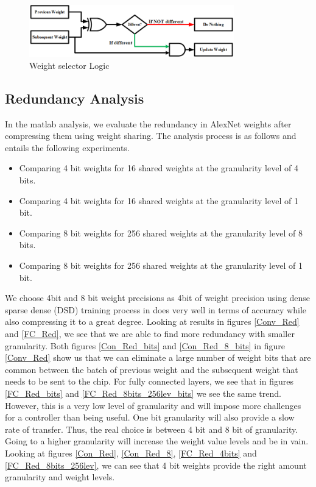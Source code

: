 \documentclass[conference]{IEEEtran}
\begin{document}
\begin{figure}[!ht]
\centering
\includegraphics[width=3.5in]{selector}
\caption{Weight selector Logic}
\label{sel}
\end{figure}

\subsection{Redundancy Analysis}
In the matlab analysis, we evaluate the redundancy in AlexNet weights after compressing them using weight sharing. 
The analysis process is as follows and entails the following experiments.
\begin{itemize}
\item Comparing 4 bit weights for 16 shared weights at the granularity level of 4 bits. 

\item Comparing 4 bit weights for 16 shared weights at the granularity level of 1 bit. 

\item Comparing 8 bit weights for 256 shared weights at the granularity level of 8 bits. 

\item Comparing 8 bit weights for 256 shared weights at the granularity level of 1 bit. 
\end{itemize}

We choose 4bit and 8 bit weight precisions as 4bit of weight precision using dense sparse dense (DSD) training process in \cite{han2016dsd} does very well in terms of accuracy while also compressing it to a great degree. Looking at results in figures \ref{Conv_Red} and \ref{FC_Red}, we see that 
we are able to find more redundancy with smaller granularity. Both figures \ref{Con_Red_bits} and \ref{Con_Red_8_bits} in figure \ref{Conv_Red} show us that we can eliminate a large number of weight bits that are common between the batch of previous weight and the subsequent weight that needs to be sent to the chip. For fully connected layers, we see that in figures \ref{FC_Red_bits} and  \ref{FC_Red_8bits_256lev_bits} we see the same trend. However, this is a very low level of granularity and will impose more challenges for a controller than being useful. One bit granularity will also provide a slow rate of transfer. Thus, the real choice is between 4 bit and 8 bit of granularity. Going to a higher granularity will increase the weight value levels and be in vain. Looking at figures \ref{Con_Red}, \ref{Con_Red_8}, \ref{FC_Red_4bits} and \ref{FC_Red_8bits_256lev}, we can see that 4 bit weights provide the right amount granularity and weight levels. 
\end{document}

